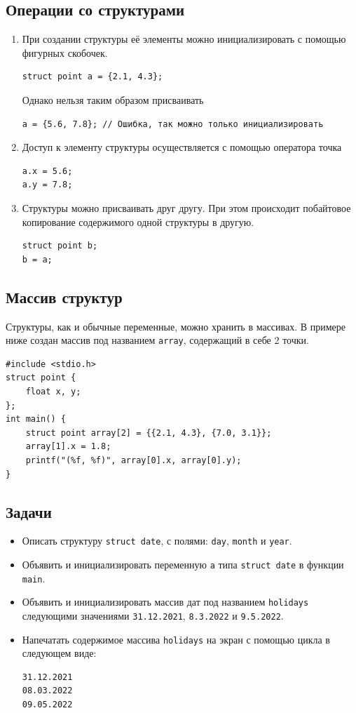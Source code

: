 \documentclass{article}
\begin{document}
\subsection*{Операции со структурами}
\begin{enumerate}
\item При создании структуры её элементы можно инициализировать с помощью фигурных скобочек.
\begin{lstlisting}
struct point a = {2.1, 4.3};
\end{lstlisting}
Однако нельзя таким образом присваивать
\begin{lstlisting}
a = {5.6, 7.8}; // Ошибка, так можно только инициализировать
\end{lstlisting}
\item Доступ к элементу структуры осуществляется с помощью оператора точка
\begin{lstlisting}
a.x = 5.6;
a.y = 7.8;
\end{lstlisting}
\item Структуры можно присваивать друг другу. При этом происходит побайтовое копирование содержимого одной структуры в другую.
\begin{lstlisting}
struct point b;
b = a;
\end{lstlisting}
\end{enumerate}

\subsection*{Массив структур}
Структуры, как и обычные переменные, можно хранить в массивах. В примере ниже создан массив под названием \texttt{array}, содержащий в себе 2 точки.
\begin{lstlisting}
#include <stdio.h>
struct point {
    float x, y;
};
int main() {
    struct point array[2] = {{2.1, 4.3}, {7.0, 3.1}};
    array[1].x = 1.8;
    printf("(%f, %f)", array[0].x, array[0].y);
}
\end{lstlisting}

\subsection*{Задачи}
\begin{itemize}
\item Описать структуру \texttt{struct date}, с полями: \texttt{day}, \texttt{month} и \texttt{year}. 
\item Объявить и инициализировать переменную \texttt{a} типа \texttt{struct date} в функции \texttt{main}.
\item Объявить и инициализировать массив дат под названием \texttt{holidays} следующими значениями \texttt{31.12.2021}, \texttt{8.3.2022} и \texttt{9.5.2022}.
\item Напечатать содержимое массива \texttt{holidays} на экран с помощью цикла в следующем виде:
\begin{verbatim}
31.12.2021
08.03.2022
09.05.2022
\end{verbatim}

\end{itemize}
\end{document}
